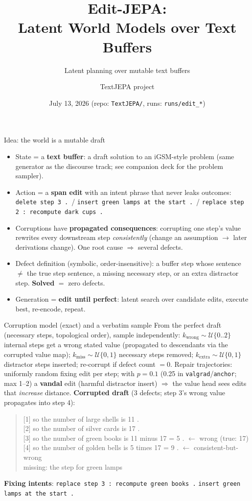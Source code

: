 \documentclass[aspectratio=169,10pt]{beamer}
\title{Edit-JEPA:\\ Latent World Models over Text Buffers}
\subtitle{Latent planning over mutable text buffers}
\author{TextJEPA project}
\date{July 13, 2026 \quad (repo: \texttt{TextJEPA/}, runs: \texttt{runs/edit\_*})}
\begin{document}
\frame{\titlepage}

\begin{frame}{Idea: the world is a mutable draft}
\begin{itemize}\itemsep2pt
  \item State = a \textbf{text buffer}: a draft solution to an iGSM-style
        problem (same generator as the discourse track; see companion deck
        for the problem sampler).
  \item Action = a \textbf{span edit} with an intent phrase that never leaks
        outcomes: \texttt{delete step 3 .}\ /
        \texttt{insert green lamps at the start .}\ /
        \texttt{replace step 2 : recompute dark cups .}
  \item Corruptions have \textbf{propagated consequences}: corrupting one
        step's value rewrites every downstream step \emph{consistently}
        (change an assumption $\to$ later derivations change). One root cause
        $\Rightarrow$ several defects.
  \item Defect definition (symbolic, order-insensitive): a buffer step whose
        sentence $\neq$ the true step sentence, a missing necessary step, or
        an extra distractor step. \textbf{Solved} $=$ zero defects.
  \item Generation = \textbf{edit until perfect}: latent search over
        candidate edits, execute best, re-encode, repeat.
\end{itemize}
\end{frame}

\begin{frame}[fragile]{Corruption model (exact) and a verbatim sample}
\small
From the perfect draft (necessary steps, topological order), sample
independently: $k_{\text{wrong}}\sim\mathcal U\{0..2\}$ internal steps get a
wrong stated value (propagated to descendants via the corrupted value map);
$k_{\text{miss}}\sim\mathcal U\{0,1\}$ necessary steps removed;
$k_{\text{extra}}\sim\mathcal U\{0,1\}$ distractor steps inserted;
re-corrupt if defect count $=0$.
Repair trajectories: uniformly random fixing edit per step; with $p{=}0.1$
(0.25 in \texttt{valgrad}/\texttt{anchor}; max 1--2) a \textbf{vandal} edit
(harmful distractor insert) $\Rightarrow$ the value head sees edits that
\emph{increase} distance.
\medskip
\footnotesize
\textbf{Corrupted draft} (3 defects; step 3's wrong value propagates into step 4):
\begin{quote}\ttfamily
{}[1] so the number of large shells is 11 .\\
{}[2] so the number of silver cards is 17 .\\
{}[3] so the number of green books is 11 minus 17 = 5 . \textcolor{cred}{$\leftarrow$ wrong (true: 17)}\\
{}[4] so the number of golden bells is 5 times 17 = 9 . \textcolor{cred}{$\leftarrow$ consistent-but-wrong}\\
\textcolor{cgray}{missing: the step for green lamps}
\end{quote}
\textbf{Fixing intents}: \texttt{replace step 3 : recompute green books .}\quad
\texttt{insert green lamps at the start .}
\end{frame}
\end{document}
